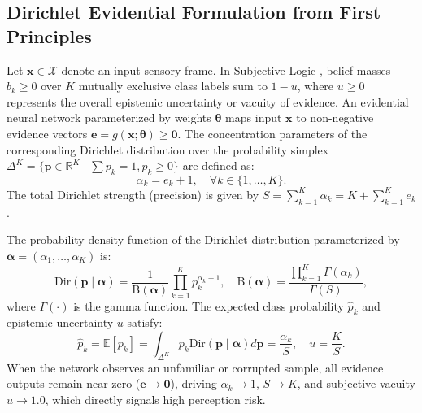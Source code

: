 \documentclass[conference]{IEEEtran}
\begin{document}
\subsection{Dirichlet Evidential Formulation from First Principles}
Let $\mathbf{x} \in \mathcal{X}$ denote an input sensory frame. In Subjective Logic \cite{jsang2016subjective}, belief masses $b_k \ge 0$ over $K$ mutually exclusive class labels sum to $1 - u$, where $u \ge 0$ represents the overall epistemic uncertainty or vacuity of evidence. An evidential neural network parameterized by weights $\boldsymbol{\theta}$ maps input $\mathbf{x}$ to non-negative evidence vectors $\mathbf{e} = g(\mathbf{x}; \boldsymbol{\theta}) \ge \mathbf{0}$. The concentration parameters of the corresponding Dirichlet distribution over the probability simplex $\Delta^K = \{\mathbf{p} \in \mathbb{R}^K \mid \sum p_k = 1, p_k \ge 0\}$ are defined as:
\begin{equation}
\alpha_k = e_k + 1, \quad \forall k \in \{1, \dots, K\}.
\end{equation}
The total Dirichlet strength (precision) is given by $S = \sum_{k=1}^K \alpha_k = K + \sum_{k=1}^K e_k$.

The probability density function of the Dirichlet distribution parameterized by $\boldsymbol{\alpha} = (\alpha_1, \dots, \alpha_K)$ is:
\begin{equation}
\mathrm{Dir}(\mathbf{p} \mid \boldsymbol{\alpha}) = \frac{1}{\mathrm{B}(\boldsymbol{\alpha})} \prod_{k=1}^K p_k^{\alpha_k - 1}, \quad \mathrm{B}(\boldsymbol{\alpha}) = \frac{\prod_{k=1}^K \Gamma(\alpha_k)}{\Gamma(S)},
\end{equation}
where $\Gamma(\cdot)$ is the gamma function. The expected class probability $\hat{p}_k$ and epistemic uncertainty $u$ satisfy:
\begin{equation}
\hat{p}_k = \mathbb{E}[p_k] = \int_{\Delta^K} p_k \mathrm{Dir}(\mathbf{p} \mid \boldsymbol{\alpha}) d\mathbf{p} = \frac{\alpha_k}{S}, \quad u = \frac{K}{S}.
\end{equation}
When the network observes an unfamiliar or corrupted sample, all evidence outputs remain near zero ($\mathbf{e} \to \mathbf{0}$), driving $\alpha_k \to 1$, $S \to K$, and subjective vacuity $u \to 1.0$, which directly signals high perception risk.
\end{document}
